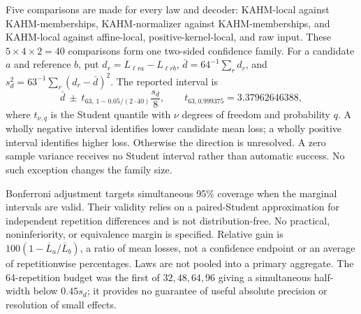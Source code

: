 Five comparisons are made for every law and decoder: KAHM-local against KAHM-memberships, KAHM-normalizer against KAHM-memberships, and KAHM-local against affine-local, positive-kernel-local, and raw input. These $5\times4\times2=40$ comparisons form one two-sided confidence family. For a candidate $a$ and reference $b$, put $d_r=L_{\ell ra}-L_{\ell rb}$, $\bar d=64^{-1}\sum_r d_r$, and $s_d^2=63^{-1}\sum_r(d_r-\bar d)^2$. The reported interval is
\begin{equation}
 \bar d\ \pm\ t_{63,\,1-0.05/(2\cdot40)}\frac{s_d}{8},
 \qquad t_{63,0.999375}=3.37962646388,
 \label{eq:interval}
\end{equation}
where $t_{\nu,q}$ is the Student quantile with $\nu$ degrees of freedom and probability $q$. A wholly negative interval identifies lower candidate mean loss; a wholly positive interval identifies higher loss. Otherwise the direction is unresolved. A zero sample variance receives no Student interval rather than automatic success. No such exception changes the family size.

Bonferroni adjustment targets simultaneous 95\% coverage when the marginal intervals are valid. Their validity relies on a paired-Student approximation for independent repetition differences and is not distribution-free. No practical, noninferiority, or equivalence margin is specified. Relative gain is $100(1-\overline L_a/\overline L_b)$, a ratio of mean losses, not a confidence endpoint or an average of repetitionwise percentages. Laws are not pooled into a primary aggregate. The 64-repetition budget was the first of $32,48,64,96$ giving a simultaneous half-width below $0.45s_d$; it provides no guarantee of useful absolute precision or resolution of small effects.
